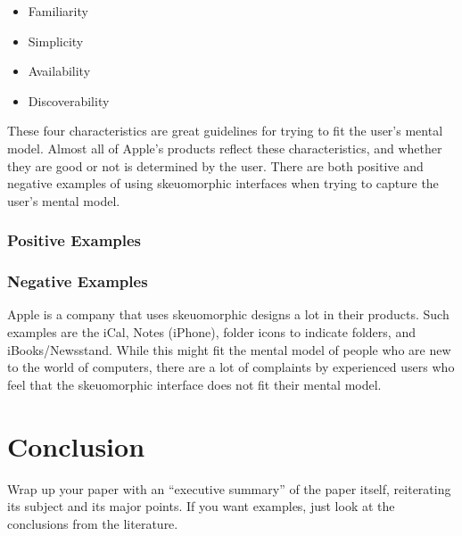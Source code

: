 \documentclass{article}
\begin{document}
\begin{itemize}
\item Familiarity
\item Simplicity
\item Availability
\item Discoverability 
\end{itemize}

These four characteristics are great guidelines for trying to fit the user's mental model.  Almost all of Apple's products reflect these characteristics, and whether they are good or not is determined by the user.  There are both positive and negative examples of using skeuomorphic interfaces when trying to capture the user's mental model.

\subsubsection{Positive Examples}

\subsubsection{Negative Examples}
Apple is a company that uses skeuomorphic designs a lot in their products. Such examples are the iCal, Notes (iPhone), folder icons to indicate folders, and iBooks/Newsstand.  While this might fit the mental model of people who are new to the world of computers, there are a lot of complaints by experienced users who feel that the skeuomorphic interface does not fit their mental model. 

\section{Conclusion}

Wrap up your paper with an ``executive summary'' of the paper itself, reiterating its subject and its major points.  If you want examples, just look at the conclusions from the literature.



\end{document}
